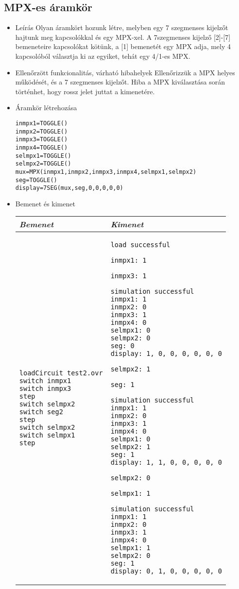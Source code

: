 \subsection{MPX-es áramkör}
\begin{itemize}
\item Leírás\newline
Olyan áramkört hozunk létre, melyben egy 7 szegmenses kijelzőt hajtunk meg kapcsolókkal és egy MPX-xel. A 7szegmenses kijelző [2]-[7] bemeneteire kapcsolókat kötünk, a [1] bemenetét egy MPX adja, mely 4 kapcsolóból választja ki az egyiket, tehát egy 4/1-es MPX.
\item Ellenőrzött funkcionalitás, várható hibahelyek\newline
Ellenőrizzük a MPX helyes működését, és a 7 szegmenses kijelzőt. Hiba a MPX kiválasztása során történhet, hogy rossz jelet juttat a kimenetére.

\item Áramkör létrehozása

\begin{verbatim}
inmpx1=TOGGLE()
inmpx2=TOGGLE()
inmpx3=TOGGLE()
inmpx4=TOGGLE()
selmpx1=TOGGLE()
selmpx2=TOGGLE()
mux=MPX(inmpx1,inmpx2,inmpx3,inmpx4,selmpx1,selmpx2)
seg=TOGGLE()
display=7SEG(mux,seg,0,0,0,0,0)
\end{verbatim}

\item Bemenet és kimenet\newline

\begin{tabular}{|p{7cm}|p{7cm}|} 
\hline 
\textit{Bemenet} & \textit{Kimenet} \\ \hline
\begin{verbatim}
loadCircuit test2.ovr
switch inmpx1
switch inmpx3
step
switch selmpx2
switch seg2
step
switch selmpx2
switch selmpx1
step
\end{verbatim}
& 
\begin{verbatim}
load successful

inmpx1: 1

inmpx3: 1

simulation successful
inmpx1: 1
inmpx2: 0
inmpx3: 1
inmpx4: 0
selmpx1: 0
selmpx2: 0
seg: 0
display: 1, 0, 0, 0, 0, 0, 0

selmpx2: 1

seg: 1

simulation successful
inmpx1: 1
inmpx2: 0
inmpx3: 1
inmpx4: 0
selmpx1: 0
selmpx2: 1
seg: 1
display: 1, 1, 0, 0, 0, 0, 0

selmpx2: 0

selmpx1: 1

simulation successful
inmpx1: 1
inmpx2: 0
inmpx3: 1
inmpx4: 0
selmpx1: 1
selmpx2: 0
seg: 1
display: 0, 1, 0, 0, 0, 0, 0

\end{verbatim}
\\ \hline
\end{tabular}

\end{itemize}

